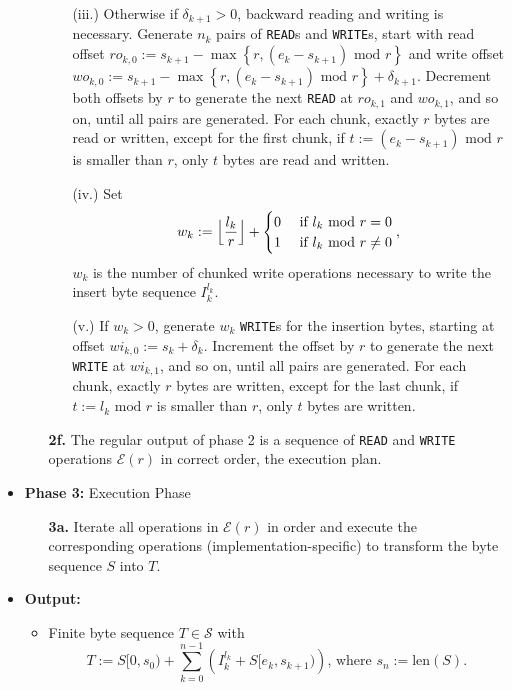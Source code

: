 \documentclass[english, 10pt, openright, twocolumn, landscape, twoside, notitlepage, a4paper, pdftex]		
{article}
\begin{document}
\begin{itemize}
\begin{enumerate}
\begin{enumerate}
\item [(iii.)] Otherwise if $\delta_{k+1}>0$, backward reading and writing is necessary. Generate $n_{k}$ pairs of \texttt{READ}s and \texttt{WRITE}s, start with read offset $ro_{k,0}:=s_{k+1}-\max\left\{r, \left(e_{k}-s_{k+1}\right)\text{ mod } r\right\}$ and write offset $wo_{k,0}:=s_{k+1}-\max\left\{r, \left(e_{k}-s_{k+1}\right)\text{ mod } r\right\}+\delta_{k+1}$. Decrement both offsets by $r$ to generate the next \texttt{READ} at $ro_{k,1}$ and $wo_{k,1}$, and so on, until all pairs are generated. For each chunk, exactly $r$ bytes are read or written, except for the first chunk, if $t:=\left(e_{k}-s_{k+1}\right)\text{ mod } r$ is smaller than $r$, only $t$ bytes are read and written.
\item [(iv.)] Set 
\[w_{k}:=\Bigl\lfloor\frac{l_{k}}{r}\Bigr\rfloor+
\begin{cases}
0 & \text{ if }l_{k}\text{ mod } r = 0\\
1 & \text{ if }l_{k}\text{ mod } r \neq 0\\
\end{cases},\]
$w_{k}$ is the number of chunked write operations necessary to write the insert byte sequence $I_{k}^{l_{k}}$.
\item [(v.)] If $w_{k}>0$, generate $w_{k}$ \texttt{WRITE}s for the insertion bytes, starting at offset $wi_{k,0}:=s_{k}+\delta_{k}$. Increment the offset by $r$ to generate the next \texttt{WRITE} at $wi_{k,1}$, and so on, until all pairs are generated. For each chunk, exactly $r$ bytes are written, except for the last chunk, if $t:=l_{k}\text{ mod } r$ is smaller than $r$, only $t$ bytes are written.
\end{enumerate}
\item [\textbf{2f.}] The regular output of phase 2 is a sequence of \texttt{READ} and \texttt{WRITE} operations $\mathcal{E}(r)$ in correct order, the execution plan.
\end{enumerate}
\item \textbf{Phase 3:} Execution Phase
\begin{enumerate}
\item [\textbf{3a.}] Iterate all operations in $\mathcal{E}(r)$ in order and execute the corresponding operations (implementation-specific) to transform the byte sequence $S$ into $T$.
\end{enumerate}
\item \textbf{Output:}
\begin{itemize}
\item Finite byte sequence $T\in\mathcal{S}$ with
\[T:=S[0,s_{0})+\sum_{k=0}^{n-1}{\left(I_{k}^{l_{k}}+S[e_{k},s_{k+1})\right)}\text{, where }s_{n}:=\text{len}(S).\]
\end{itemize}
\end{itemize}
\end{document}
